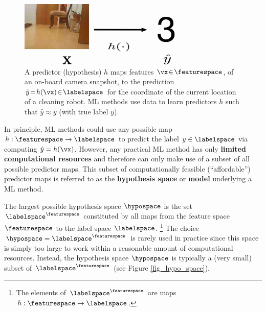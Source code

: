 \documentclass[12pt]{report}
\begin{document}
\begin{figure}[htbp]
%   
\begin{minipage}{\textwidth}
\begin{center}
   \includegraphics[width=0.7\textwidth]{HypoMap1.jpg}  
   \end{center}
\end{minipage}
\caption{A predictor (hypothesis) $h$ maps features $\vx\!\in\!\featurespace$, of 
	an on-board camera snapshot, to the prediction $\hat{y}\!=\!h(\vx)\!\in\!\labelspace$ 
	for the coordinate of the current location of a cleaning robot. ML methods use data 
	to learn predictors $h$ such that $\hat{y}\!\approx\!y$ (with true label $y$).}
\label{fig_feature_map_eval}
\end{figure}

In principle, ML methods could use any possible map $h: \featurespace \rightarrow \labelspace$ 
to predict the label $y \in \labelspace$ via computing $\hat{y} = h(\vx)$. 
However, any practical ML method has only {\bf limited computational resources} 
and therefore can only make use of a subset of all possible predictor maps. 
This subset of computationally feasible (``affordable'') predictor maps 
is referred to as the {\bf hypothesis space} or {\bf model} underlying 
a ML method. 

The largest possible hypothesis space $\hypospace$ is the set $\labelspace^{\featurespace}$ 
constituted by all maps from the feature space $\featurespace$ to the label space $\labelspace$.
\footnote{The elements of $\labelspace^{\featurespace}$ are maps $h: \featurespace \rightarrow \labelspace$.}   
The choice $\hypospace = \labelspace^{\featurespace}$ is rarely used 
in practice since this space is simply too large to work within a reasonable 
amount of computational resources. Instead, the hypothesis space $\hypospace$ 
is typically a (very small) subset of $\labelspace^{\featurespace}$ (see Figure \ref{fig_hypo_space}). 
\end{document}
